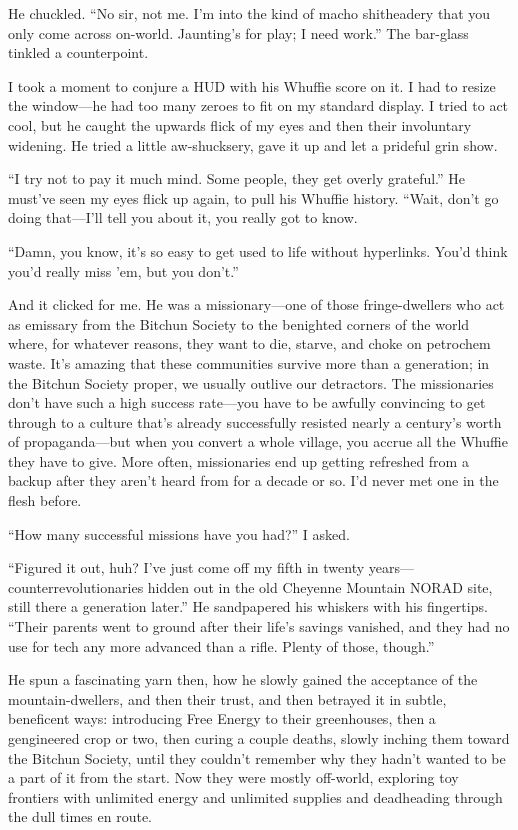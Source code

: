 He chuckled. “No sir, not me. I'm into the kind of macho
shitheadery that you only come across on-world. Jaunting's for
play; I need work.” The bar-glass tinkled a counterpoint.

I took a moment to conjure a HUD with his Whuffie score on it. I
had to resize the window—he had too many zeroes to fit on my
standard display. I tried to act cool, but he caught the upwards
flick of my eyes and then their involuntary widening. He tried a
little aw-shucksery, gave it up and let a prideful grin show.

“I try not to pay it much mind. Some people, they get overly
grateful.” He must've seen my eyes flick up again, to pull his
Whuffie history. “Wait, don't go doing that—I'll tell you about it,
you really got to know.

“Damn, you know, it's so easy to get used to life without
hyperlinks. You'd think you'd really miss 'em, but you don't.”

And it clicked for me. He was a missionary—one of those
fringe-dwellers who act as emissary from the Bitchun Society to the
benighted corners of the world where, for whatever reasons, they
want to die, starve, and choke on petrochem waste. It's amazing
that these communities survive more than a generation; in the
Bitchun Society proper, we usually outlive our detractors. The
missionaries don't have such a high success rate—you have to be
awfully convincing to get through to a culture that's already
successfully resisted nearly a century's worth of propaganda—but
when you convert a whole village, you accrue all the Whuffie they
have to give. More often, missionaries end up getting refreshed
from a backup after they aren't heard from for a decade or so. I'd
never met one in the flesh before.

“How many successful missions have you had?” I asked.

“Figured it out, huh? I've just come off my fifth in twenty
years—counterrevolutionaries hidden out in the old Cheyenne
Mountain NORAD site, still there a generation later.” He
sandpapered his whiskers with his fingertips. “Their parents went
to ground after their life's savings vanished, and they had no use
for tech any more advanced than a rifle. Plenty of those, though.”

He spun a fascinating yarn then, how he slowly gained the
acceptance of the mountain-dwellers, and then their trust, and then
betrayed it in subtle, beneficent ways: introducing Free Energy to
their greenhouses, then a gengineered crop or two, then curing a
couple deaths, slowly inching them toward the Bitchun Society,
until they couldn't remember why they hadn't wanted to be a part of
it from the start. Now they were mostly off-world, exploring toy
frontiers with unlimited energy and unlimited supplies and
deadheading through the dull times en route.

